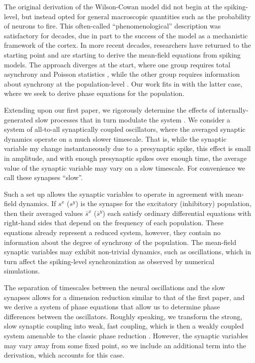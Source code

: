 \documentclass[a4paper,11pt]{article}
\begin{document}
The original derivation of the Wilson-Cowan model did not begin at the spiking-level, but instead opted for general macroscopic quantities such as the probability of neurons to fire. This often-called ``phenomenological'' description was satisfactory for decades, due in part to the success of the model as a mechanistic framework of the cortex. In more recent decades, researchers have returned to the starting point and are starting to derive the mean-field equations from spiking models. The approach diverges at the start, where one group requires total asynchrony \cite{laing2014derivation,laing_exact_2015,renart2007mean} and Poisson statistics \cite{amit1997model,amit1997dynamics}, while the other group requires information about synchrony at the population-level \cite{coombes2016next,so2008synchronization}. Our work fits in with the latter case, where we seek to derive phase equations for the population.

Extending upon our first paper, we rigorously determine the effects of internally-generated slow processes that in turn modulate the system \cite{park2018multiple}. We consider a system of all-to-all synaptically coupled oscillators, where the averaged synaptic dynamics operate on a much slower timescale. That is, while the synaptic variable my change instantaneously due to a presynaptic spike, this effect is small in amplitude, and with enough presynaptic spikes over enough time, the average value of the synaptic variable may vary on a slow timescale. For convenience we call these synapses ``slow''.

Such a set up allows the synaptic variables to operate in agreement with mean-field dynamics. If $s^x$ ($s^y$) is the synapse for the excitatory (inhibitory) population, then their averaged values $\bar s^x$ ($\bar s^y$) each satisfy ordinary differential equations with right-hand sides that depend on the frequency of each population. These equations already represent a reduced system, however, they contain no information about the degree of synchrony of the population. The mean-field synaptic variables may exhibit non-trivial dynamics, such as oscillations, which in turn affect the spiking-level synchronization as observed by numerical simulations.

The separation of timescales between the neural oscillations and the slow synapses allows for a dimension reduction similar to that of the first paper, and we derive a system of phase equations that allow us to determine phase differences between the oscillators. Roughly speaking, we transform the strong, slow synaptic coupling into weak, fast coupling, which is then a weakly coupled system amenable to the classic phase reduction \cite{rubinrubin}. However, the synaptic variables may vary away from some fixed point, so we include an additional term into the derivation, which accounts for this case.
\end{document}
